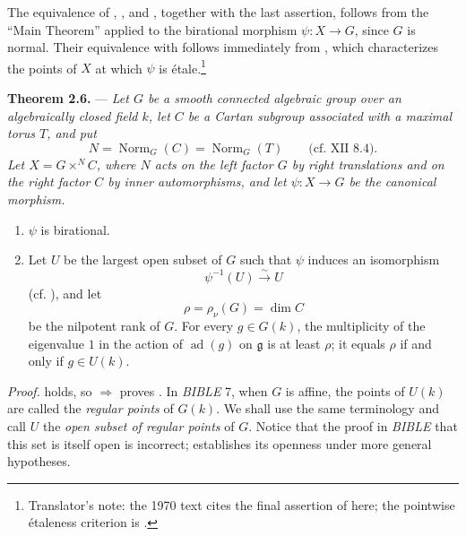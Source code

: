 The equivalence of , , and , together with the last
assertion, follows from the ``Main Theorem'' applied to the
birational morphism \(\psi:X\to G\), since \(G\) is normal. Their
equivalence with  follows immediately from , which
characterizes the points of \(X\) at which \(\psi\) is
étale.\footnote{Translator's note: the 1970 text cites the final assertion of  here;
the pointwise étaleness criterion is .}

\medskip
\noindent{}\textbf{Theorem 2.6.} ---
\textit{Let \(G\) be a smooth connected algebraic group over an
algebraically closed field \(k\), let \(C\) be a Cartan subgroup
associated with a maximal torus \(T\), and put}
\[
  N=\operatorname{Norm}_G(C)=\operatorname{Norm}_G(T)
  \qquad\text{(cf. XII~8.4).}
\]
\textit{Let \(X=G\times^N C\), where \(N\) acts on the left factor
\(G\) by right translations and on the right factor \(C\) by inner
automorphisms, and let \(\psi:X\to G\) be the canonical morphism.}

\begin{enumerate}
\item[\textit{a)}] 
  \(\psi\) is birational.

\item[\textit{b)}] 
  Let \(U\) be the largest open subset of \(G\) such that \(\psi\)
  induces an isomorphism
  \[
    \psi^{-1}(U)\xrightarrow{\sim}U
  \]
  (cf. ), and let
  \[
    \rho=\rho_\nu(G)=\dim C
  \]
  be the nilpotent rank of \(G\). For every \(g\in G(k)\), the
  multiplicity of the eigenvalue \(1\) in the action of
  \(\operatorname{ad}(g)\) on \(\mathfrak g\) is at least \(\rho\);
  it equals \(\rho\) if and only if \(g\in U(k)\).
\end{enumerate}

\noindent\textit{Proof.}
 holds, so  \(\Rightarrow\)  proves .
In \emph{BIBLE} 7, when \(G\) is affine, the points of \(U(k)\) are
called the \emph{regular points} of \(G(k)\). We shall use the same
terminology and call \(U\) the \emph{open subset of regular points}
of \(G\). Notice that the proof in \emph{BIBLE} that this set is
itself open is incorrect;  establishes its
openness under more general hypotheses.

